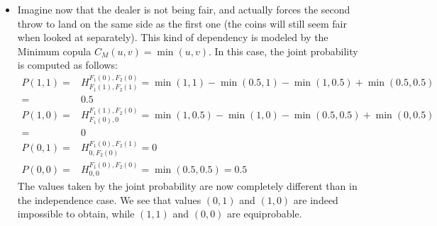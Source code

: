 \begin{example}
\begin{itemize}
        \item Imagine now that the dealer is not being fair, and actually forces the second throw to land on the same side as the first one (the coins will still seem fair when looked at separately). This kind of dependency is modeled by the Minimum copula $C_M(u,v)=\min(u,v)$. In this case, the joint probability is computed as follows: 
		\begin{align*}
            P(1,1) =& H_{F_1(1), F_2(1)}^{F_1(0), F_2(0)} = \min(1,1) - \min(0.5,1) - \min(1,0.5) + \min(0.5,0.5)\\
            =& 0.5\\
            P(1,0) =& H_{F_1(0), 0}^{F_1(1), F_2(0)} =\min(1,0.5) - \min(1, 0) - \min(0.5,0.5) + \min(0,0.5)\\
            =& 0\\
            P(0,1) =& H_{0, F_2(0)}^{F_1(0), F_2(1)} = 0 \\
            P(0,0) =& H_{0, 0}^{F_1(0), F_2(0)} = \min(0.5,0.5)=0.5
        \end{align*}
        The values taken by the joint probability are now completely different than in the independence case. We see that values $(0,1)$ and $(1,0)$ are indeed impossible to obtain, while $(1,1)$ and $(0,0)$ are equiprobable.
        

\end{itemize}
\end{example}
